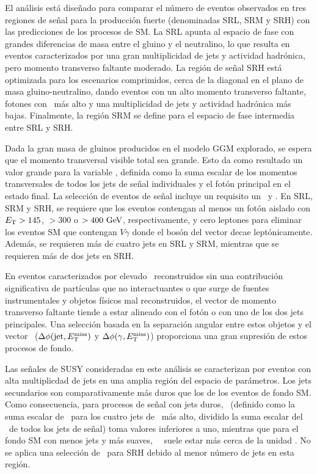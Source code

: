 El análisis está diseñado para comparar el número de eventos observados en tres regiones de señal para la producción fuerte (denominadas SRL, SRM y SRH) con las predicciones de los procesos de SM.
La SRL apunta al espacio de fase con grandes diferencias de masa entre el gluino y el neutralino, lo que resulta en eventos caracterizados por una gran multiplicidad de jets y actividad hadrónica, pero momento transverso faltante moderado. La región de señal SRH está optimizada para los escenarios comprimidos, cerca de la diagonal en el plano de masa gluino-neutralino, dando eventos con un alto momento transverso faltante, fotones con \pt\ más alto y una multiplicidad de jets y actividad hadrónica más bajas. Finalmente, la región SRM se define para el espacio de fase intermedia entre SRL y SRH.

Dada la gran masa de gluinos producidos en el modelo GGM explorado, se espera que el momento transversal visible total sea grande. Esto da como resultado un valor grande para la variable \HT, definida como la suma escalar de los momentos transversales de todos los jets de señal individuales y el fotón principal en el estado final.
La selección de eventos de señal incluye un requisito un \HT \ y \met.
En SRL, SRM y SRH, se requiere que los eventos contengan al menos un fotón aislado con $E_{\text{T}}> 145$, $>300 $ o $>400\ \text{GeV}$, respectivamente, y cero leptones para eliminar los eventos SM que contengan $ V\gamma$ donde el bosón del vector decae leptónicamente. Además, se requieren más de cuatro jets en SRL y SRM, mientras que se requieren más de dos jets en SRH.

En eventos caracterizados por elevado \met\ reconstruidos sin una contribución significativa de partículas que no interactuantes o que surge de fuentes instrumentales y objetos físicos mal reconstruidos, el vector de momento transverso faltante tiende a
estar alineado con el fotón o con uno de los dos jets principales. Una selección basada en la separación angular entre estos objetos y el vector \met\ ($\Delta\phi(\text{jet}, E_{\text{T}}^{\text{miss}})$ y $\Delta\phi(\gamma, E_{\text{T}}^{\text{miss}})$) proporciona una gran supresión de estos procesos de fondo.

Las señales de SUSY consideradas en este análisis se caracterizan por
eventos con alta multiplicdad de jets en una amplia región del espacio de parámetros. Los jets secundarios son comparativamente más duros que los de los eventos de fondo SM. Como consecuencia, para procesos de señal con jets duros, \rtf\ (definido como la suma escalar de \pt\ para los cuatro jets de \pt\ más alto, dividido la suma escalar del \pt\ de todos los jets de señal) toma valores inferiores a uno, mientras que para el fondo SM con menos jets y más suaves, \ \rtf\ suele estar más cerca de la unidad \cite{SUSY-2016-27}.
No se aplica una selección de \rtf\ para SRH debido al menor número de jets en esta región.


